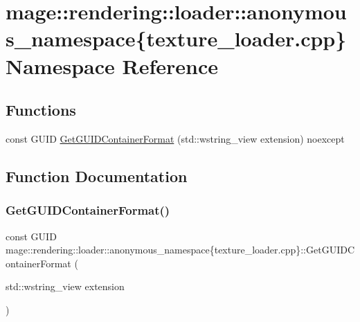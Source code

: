 \hypertarget{namespacemage_1_1rendering_1_1loader_1_1anonymous__namespace_02texture__loader_8cpp_03}{}\section{mage\+:\+:rendering\+:\+:loader\+:\+:anonymous\+\_\+namespace\{texture\+\_\+loader.\+cpp\} Namespace Reference}
\label{namespacemage_1_1rendering_1_1loader_1_1anonymous__namespace_02texture__loader_8cpp_03}
\subsection*{Functions}
\begin{DoxyCompactItemize}
\item 
const G\+U\+ID \mbox{\hyperlink{namespacemage_1_1rendering_1_1loader_1_1anonymous__namespace_02texture__loader_8cpp_03_a30e37e9cea9d0ef1912c7bdb06985481}{Get\+G\+U\+I\+D\+Container\+Format}} (std\+::wstring\+\_\+view extension) noexcept
\end{DoxyCompactItemize}


\subsection{Function Documentation}
\mbox{\label{namespacemage_1_1rendering_1_1loader_1_1anonymous__namespace_02texture__loader_8cpp_03_a30e37e9cea9d0ef1912c7bdb06985481}} 
\subsubsection{\texorpdfstring{Get\+G\+U\+I\+D\+Container\+Format()}{GetGUIDContainerFormat()}}
{\footnotesize\ttfamily const G\+U\+ID mage\+::rendering\+::loader\+::anonymous\+\_\+namespace\{texture\+\_\+loader.\+cpp\}\+::Get\+G\+U\+I\+D\+Container\+Format (\begin{DoxyParamCaption}\item[{std\+::wstring\+\_\+view}]{extension }\end{DoxyParamCaption})\hspace{0.3cm}{\ttfamily [noexcept]}}

